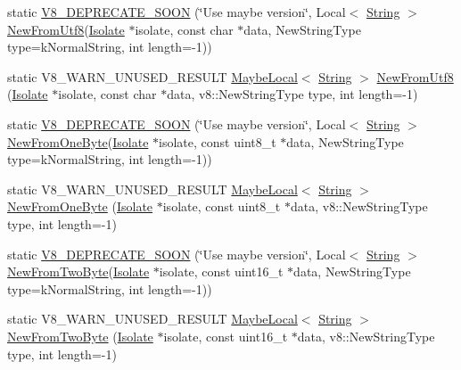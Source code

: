 \begin{DoxyCompactItemize}
\item 
static \hyperlink{classv8_1_1_string_aa9d64688e3535b3daabafcc46a59ce5a}{V8\+\_\+\+D\+E\+P\+R\+E\+C\+A\+T\+E\+\_\+\+S\+O\+O\+N} (\char`\"{}Use maybe version\char`\"{}, Local$<$ \hyperlink{classv8_1_1_string}{String} $>$ \hyperlink{classv8_1_1_string_a851bcf20fecb01b97f14131ce609f701}{New\+From\+Utf8}(\hyperlink{classv8_1_1_isolate}{Isolate} $\ast$isolate, const char $\ast$data, New\+String\+Type type=k\+Normal\+String, int length=-\/1))
\item 
static V8\+\_\+\+W\+A\+R\+N\+\_\+\+U\+N\+U\+S\+E\+D\+\_\+\+R\+E\+S\+U\+L\+T \hyperlink{classv8_1_1_maybe_local}{Maybe\+Local}$<$ \hyperlink{classv8_1_1_string}{String} $>$ \hyperlink{classv8_1_1_string_a851bcf20fecb01b97f14131ce609f701}{New\+From\+Utf8} (\hyperlink{classv8_1_1_isolate}{Isolate} $\ast$isolate, const char $\ast$data, v8\+::\+New\+String\+Type type, int length=-\/1)
\item 
static \hyperlink{classv8_1_1_string_a97b6caaf4674979cfbd2dfd6c12e48f3}{V8\+\_\+\+D\+E\+P\+R\+E\+C\+A\+T\+E\+\_\+\+S\+O\+O\+N} (\char`\"{}Use maybe version\char`\"{}, Local$<$ \hyperlink{classv8_1_1_string}{String} $>$ \hyperlink{classv8_1_1_string_a2b8cf518523a62d97360c07ed33d8aa6}{New\+From\+One\+Byte}(\hyperlink{classv8_1_1_isolate}{Isolate} $\ast$isolate, const uint8\+\_\+t $\ast$data, New\+String\+Type type=k\+Normal\+String, int length=-\/1))
\item 
static V8\+\_\+\+W\+A\+R\+N\+\_\+\+U\+N\+U\+S\+E\+D\+\_\+\+R\+E\+S\+U\+L\+T \hyperlink{classv8_1_1_maybe_local}{Maybe\+Local}$<$ \hyperlink{classv8_1_1_string}{String} $>$ \hyperlink{classv8_1_1_string_a2b8cf518523a62d97360c07ed33d8aa6}{New\+From\+One\+Byte} (\hyperlink{classv8_1_1_isolate}{Isolate} $\ast$isolate, const uint8\+\_\+t $\ast$data, v8\+::\+New\+String\+Type type, int length=-\/1)
\item 
static \hyperlink{classv8_1_1_string_aeab948105979e2ffd61eb552b0da4e50}{V8\+\_\+\+D\+E\+P\+R\+E\+C\+A\+T\+E\+\_\+\+S\+O\+O\+N} (\char`\"{}Use maybe version\char`\"{}, Local$<$ \hyperlink{classv8_1_1_string}{String} $>$ \hyperlink{classv8_1_1_string_aaad4c7c856c29d79db85994c301fe601}{New\+From\+Two\+Byte}(\hyperlink{classv8_1_1_isolate}{Isolate} $\ast$isolate, const uint16\+\_\+t $\ast$data, New\+String\+Type type=k\+Normal\+String, int length=-\/1))
\item 
static V8\+\_\+\+W\+A\+R\+N\+\_\+\+U\+N\+U\+S\+E\+D\+\_\+\+R\+E\+S\+U\+L\+T \hyperlink{classv8_1_1_maybe_local}{Maybe\+Local}$<$ \hyperlink{classv8_1_1_string}{String} $>$ \hyperlink{classv8_1_1_string_aaad4c7c856c29d79db85994c301fe601}{New\+From\+Two\+Byte} (\hyperlink{classv8_1_1_isolate}{Isolate} $\ast$isolate, const uint16\+\_\+t $\ast$data, v8\+::\+New\+String\+Type type, int length=-\/1)

\end{DoxyCompactItemize}
